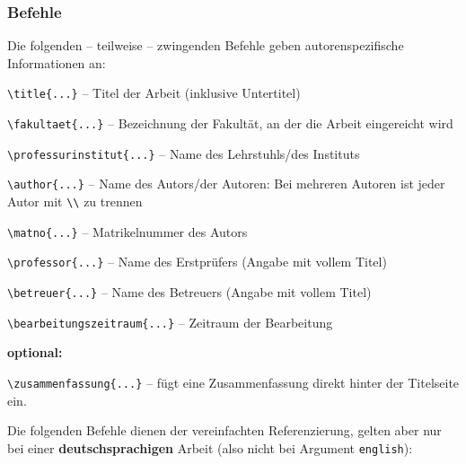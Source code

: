 \subsubsection{Befehle}
\label{chap:Befehle}

Die folgenden -- teilweise -- zwingenden Befehle geben autorenspezifische Informationen an:

\begin{description}

  \item{\verb"\title{...}"} -- Titel der Arbeit (inklusive Untertitel)

  \item{\verb"\fakultaet{...}"} -- Bezeichnung der Fakultät, an der die Arbeit eingereicht wird

  \item{\verb"\professurinstitut{...}"} -- Name des Lehrstuhls/des Instituts

  \item{\verb"\author{...}"} -- Name des Autors/der Autoren: Bei mehreren Autoren ist jeder Autor mit \verb"\\" zu
      trennen

  \item{\verb"\matno{...}"} -- Matrikelnummer des Autors

  \item{\verb"\professor{...}"} -- Name des Erstprüfers (Angabe mit vollem Titel)

  \item{\verb"\betreuer{...}"} -- Name des Betreuers (Angabe mit vollem Titel)

  \item{\verb"\bearbeitungszeitraum{...}"} -- Zeitraum der Bearbeitung

\end{description}

\textbf{optional:}

\begin{description}

  \item{\verb"\zusammenfassung{...}"} -- fügt eine Zusammenfassung direkt hinter der Titelseite ein.

\end{description}

Die folgenden Befehle dienen der vereinfachten Referenzierung, gelten aber nur bei einer \textbf{deutschsprachigen} Arbeit (also nicht bei Argument \verb"english"):

